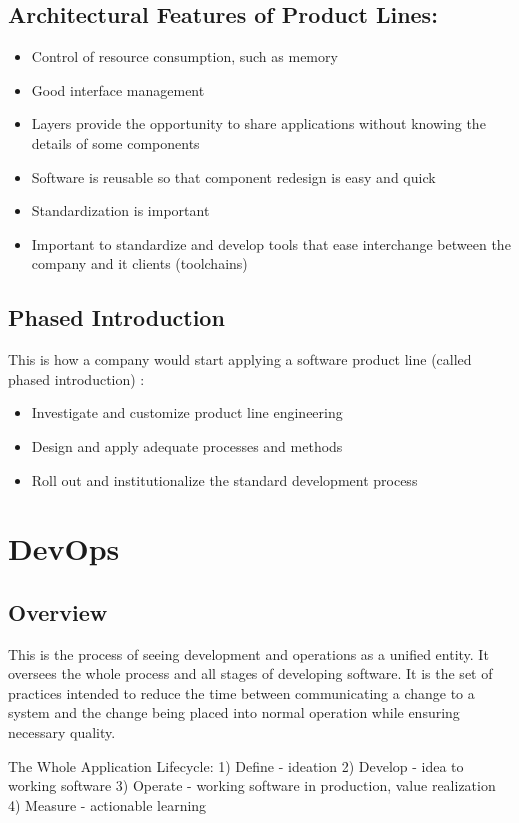 \documentclass{report}
\begin{document}
\section{Architectural Features of Product Lines:}
\begin{itemize}
\item Control of resource consumption, such as memory
\item Good interface management
\item Layers provide the opportunity to share applications without knowing the details of some components
\item Software is reusable so that component redesign is easy and quick
\item Standardization is important
\item Important to standardize and develop tools that ease interchange between the company and it clients (toolchains)
\end{itemize}

\section{Phased Introduction}
This is how a company would start applying a software product line (called phased introduction) :
\begin{itemize}
\item Investigate and customize product line engineering
\item Design and apply adequate processes and methods
\item Roll out and institutionalize the standard development process
\end{itemize}

\chapter{DevOps}
\section{Overview}
This is the process of seeing development and operations as a unified entity. It oversees the whole process and all stages of developing software. It is the set of practices intended to reduce the time between communicating a change to a system and the change being placed into normal operation while ensuring necessary quality. 

The Whole Application Lifecycle:
1)  Define - ideation
2)  Develop - idea to working software
3)  Operate - working software in production, value realization
4)  Measure - actionable learning
\end{document}
